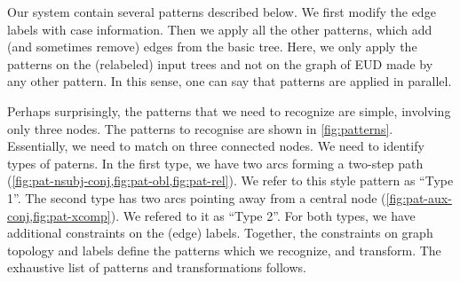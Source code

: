 \documentclass[11pt,a4paper]{article}
\begin{document}
Our system contain several patterns described below. We first modify
the edge labels with case information. Then we apply all the other
patterns, which add (and sometimes remove) edges from the basic
tree. Here, we only apply the patterns on the (relabeled) input trees
and not on the graph of EUD made by any other pattern. In this sense,
one can say that patterns are applied in parallel.

Perhaps surprisingly, the patterns that we need to recognize are
simple, involving only three nodes. The patterns to recognise are
shown in \cref{fig:patterns}. Essentially, we need to match on three
connected nodes.  We need to identify types of paterns. In the first type, we have two
arcs forming a two-step path
(\cref{fig:pat-nsubj-conj,fig:pat-obl,fig:pat-rel}). We refer to this
style pattern as ``Type 1''.  The second type has two arcs pointing away from
a central node (\cref{fig:pat-aux-conj,fig:pat-xcomp}). We refered to it as
``Type 2''.
For both types, we have additional constraints on the (edge) labels. Together, the constraints
on graph topology and labels define the patterns which we recognize, and transform.
The exhaustive list of patterns and transformations follows.
\end{document}
